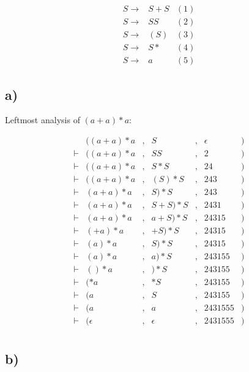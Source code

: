 
\begin{equation*}
  \begin{aligned}
  S \rightarrow & S + S & (1) \\
  S \rightarrow & SS & (2) \\
  S \rightarrow & (S) & (3) \\
  S \rightarrow & S* & (4) \\
  S \rightarrow & a & (5)
\end{aligned}
\end{equation*}

\subsection*{a)}

Leftmost analysis of $(a + a)*a$:

\begin{equation*}
  \begin{aligned}
          & ((a + a)*a&, &S&, &\epsilon &) \\
 \vdash   & ((a + a)*a&,  &SS&, &2 &) \\
 \vdash   & ((a + a)*a&,  & S*S&, &24&) \\
 \vdash   & ((a + a)*a&,  & (S)*S&, &243&) \\
 \vdash   & (a + a)*a&,  & S)*S&, &243&) \\
 \vdash   & (a + a)*a&,  & S + S)*S&, &2431&) \\
 \vdash   & (a + a)*a&,  & a + S)*S&, &24315&) \\
 \vdash   & (+ a)*a&,  & + S)*S&, &24315&) \\
 \vdash   & (a)*a&,  & S)*S&, &24315&) \\
 \vdash   & (a)*a&,  & a)*S&, &243155&) \\
 \vdash   & ()*a&,  & )*S&, &243155&) \\
 \vdash   & (*a&,  & *S&, &243155&) \\
 \vdash   & (a&,  & S&, &243155&) \\
 \vdash   & (a&,  & a&, &2431555&) \\
 \vdash   & (\epsilon&,  & \epsilon&, &2431555&) \\
\end{aligned}
\end{equation*}

\subsection*{b)}

